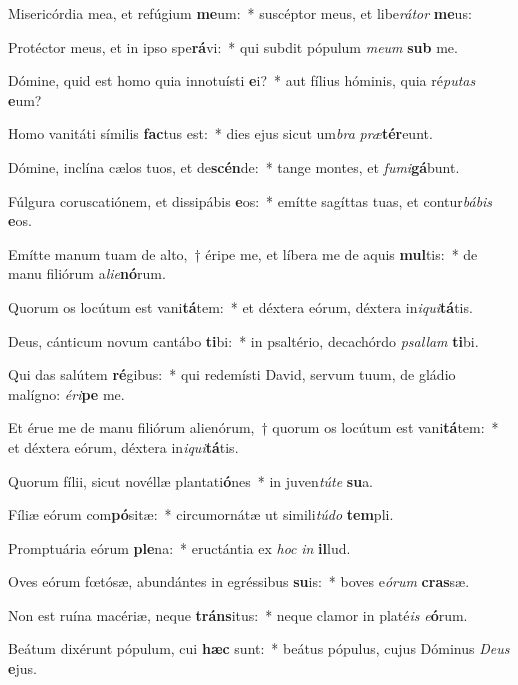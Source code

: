 \item Misericórdia mea, et refúgium \textbf{me}um:~* suscéptor meus, et libe\textit{rá}\textit{tor} \textbf{me}us:
\item Protéctor meus, et in ipso spe\textbf{rá}vi:~* qui subdit pópulum \textit{me}\textit{um} \textbf{sub} me.
\item Dómine, quid est homo quia innotuísti \textbf{e}i?~* aut fílius hóminis, quia ré\textit{pu}\textit{tas} \textbf{e}um?
\item Homo vanitáti símilis \textbf{fac}tus est:~* dies ejus sicut um\textit{bra} \textit{præ}\textbf{tér}eunt.
\item Dómine, inclína cælos tuos, et de\textbf{scén}de:~* tange montes, et \textit{fu}\textit{mi}\textbf{gá}bunt.
\item Fúlgura coruscatiónem, et dissipábis \textbf{e}os:~* emítte sagíttas tuas, et contur\textit{bá}\textit{bis} \textbf{e}os.
\item Emítte manum tuam de alto,~† éripe me, et líbera me de aquis \textbf{mul}tis:~* de manu filiórum a\textit{li}\textit{e}\textbf{nó}rum.
\item Quorum os locútum est vani\textbf{tá}tem:~* et déxtera eórum, déxtera in\textit{i}\textit{qui}\textbf{tá}tis.
\item Deus, cánticum novum cantábo \textbf{ti}bi:~* in psaltério, decachórdo \textit{psal}\textit{lam} \textbf{ti}bi.
\item Qui das salútem \textbf{ré}gibus:~* qui redemísti David, servum tuum, de gládio malígno: \textit{é}\textit{ri}\textbf{pe} me.
\item Et érue me de manu filiórum alienórum,~† quorum os locútum est vani\textbf{tá}tem:~* et déxtera eórum, déxtera in\textit{i}\textit{qui}\textbf{tá}tis.
\item Quorum fílii, sicut novéllæ plantati\textbf{ó}nes~* in juven\textit{tú}\textit{te} \textbf{su}a.
\item Fíliæ eórum com\textbf{pó}sitæ:~* circumornátæ ut simili\textit{tú}\textit{do} \textbf{tem}pli.
\item Promptuária eórum \textbf{ple}na:~* eructántia ex \textit{hoc} \textit{in} \textbf{il}lud.
\item Oves eórum fœtósæ, abundántes in egréssibus \textbf{su}is:~* boves e\textit{ó}\textit{rum} \textbf{cras}sæ.
\item Non est ruína macériæ, neque \textbf{tráns}itus:~* neque clamor in platé\textit{is} \textit{e}\textbf{ó}rum.
\item Beátum dixérunt pópulum, cui \textbf{hæc} sunt:~* beátus pópulus, cujus Dóminus \textit{De}\textit{us} \textbf{e}jus.
